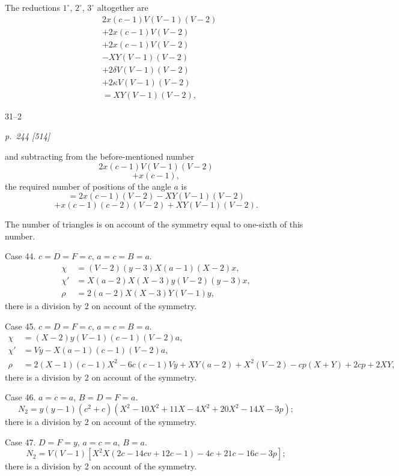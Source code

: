 \documentclass[11pt,a4paper]{book}
\begin{document}
The reductions $1^{\circ}$, $2^{\circ}$, $3^{\circ}$ altogether are
\begin{align*}
&2x(c - 1)V(V - 1)(V - 2) \\
&+ 2x(c - 1)V(V - 2) \\
&+ 2x(c - 1)V(V - 2) \\
&- XY(V - 1)(V - 2) \\
&+ 2\delta V(V - 1)(V - 2) \\
&+ 2\kappa V(V - 1)(V - 2) \\
&= XY(V - 1)(V - 2),
\end{align*}

\hfill 31--2

\clearpage

\bigskip
\textit{p.~244 [514]}
\smallskip

\noindent
and subtracting from the before-mentioned number
\[
2x(c - 1)V(V - 1)(V - 2)
\]
\[
+ x(c - 1),
\]
the required number of positions of the angle $a$ is
\[
= 2x(c - 1)(V - 2) - XY(V - 1)(V - 2)
\]
\[
+ x(c - 1)(c - 2)(V - 2) + XY(V - 1)(V - 2).
\]

The number of triangles is on account of the symmetry equal to one-sixth of this
number.

Case 44.  $c = D = F = c$, $a = c = B = a$.
\begin{align*}
\chi &= (V - 2)(y - 3)X(a - 1)(X - 2)x, \\
\chi' &= X(a - 2)X(X - 3)y(V - 2)(y - 3)x, \\
\rho &= 2(a - 2)X(X - 3)Y(V - 1)y,
\end{align*}
there is a division by 2 on account of the symmetry.

Case 45.  $c = D = F = c$, $a = c = B = a$.
\begin{align*}
\chi &= (X - 2)y(V - 1)(c - 1)(V - 2)a, \\
\chi' &= V\!y - X(a - 1)(c - 1)(V - 2)a, \\
\rho &= 2(X - 1)(c - 1)X^2 - 6c(c - 1)Vy + XY(a - 2) + X^2(V - 2) - cp(X + Y) + 2cp + 2XY,
\end{align*}
there is a division by 2 on account of the symmetry.

Case 46.  $a = c = a$, $B = D = F = a$.
\[
N_2 = y(y - 1)(c^2 + c)(X^2 - 10X^2 + 11X - 4X^2 + 20X^2 - 14X - 3p);
\]
there is a division by 2 on account of the symmetry.

Case 47.  $D = F = y$, $a = c = a$, $B = a$.
\[
N_2 = V(V - 1)[X^2 X (2c - 14cv + 12c - 1) - 4c + 21c - 16c - 3p];
\]
there is a division by 2 on account of the symmetry.
\end{document}
